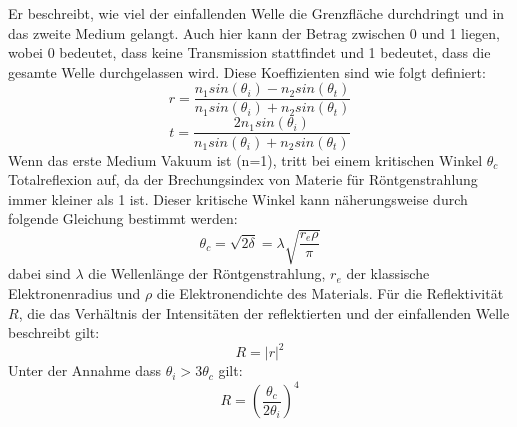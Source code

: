 Er beschreibt, wie viel der einfallenden Welle die Grenzfläche durchdringt und in das zweite Medium gelangt. Auch hier kann der Betrag 
zwischen 0 und 1 liegen, wobei 0 bedeutet, dass keine Transmission stattfindet und 1 bedeutet, dass die gesamte Welle durchgelassen wird.
Diese Koeffizienten sind wie folgt definiert:
\begin{equation}
    r=\frac{n_1sin(\theta_i)-n_2sin(\theta_t)}{n_1sin(\theta_i)+n_2sin(\theta_t)}
\end{equation}
\begin{equation}
    t=\frac{2n_1sin(\theta_i)}{n_1sin(\theta_i)+n_2sin(\theta_t)} 
\end{equation}
Wenn das erste Medium Vakuum ist (n=1), tritt bei einem kritischen Winkel $\theta_c$ Totalreflexion auf, da der Brechungsindex von Materie für
Röntgenstrahlung immer kleiner als 1 ist. Dieser kritische Winkel kann näherungsweise durch folgende Gleichung bestimmt werden:
\begin{equation}
    \theta_c = \sqrt{2\delta} = \lambda \sqrt{\frac{r_e \rho}{\pi}}
\end{equation}    
dabei sind $\lambda$ die Wellenlänge der Röntgenstrahlung, \(r_e\) der klassische Elektronenradius und $\rho$ die Elektronendichte des Materials.
Für die Reflektivität \(R\), die das Verhältnis der Intensitäten der reflektierten und der einfallenden Welle beschreibt gilt:
\begin{equation}
    R=|r|^2
\end{equation}
Unter der Annahme dass $\theta_i>3\theta_c$ gilt:
\begin{equation}
    R=(\frac{\theta_c}{2\theta_i})^4
\end{equation}    


\cite{sample}
